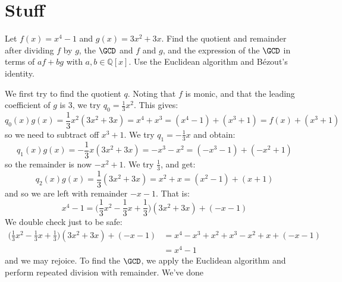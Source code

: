 \section{Stuff}
    \begin{problem}
        Let $f(x)=x^{4}-1$ and $g(x)=3x^{2}+3x$. Find the quotient and
        remainder after dividing $f$ by $g$, the $\GCD$ and $f$ and $g$,
        and the expression of the $\GCD$ in terms of $af+bg$ with
        $a,b\in\mathbb{Q}[x]$. Use the Euclidean algorithm and B\'{e}zout's
        identity.
    \end{problem}
    \begin{solution}
        We first try to find the quotient $q$. Noting that $f$ is monic, and
        that the leading coefficient of $g$ is 3, we try
        $q_{0}=\frac{1}{3}x^{2}$. This gives:
        \begin{equation}
            q_{0}(x)g(x)=\frac{1}{3}x^{2}(3x^{2}+3x)
                =x^{4}+x^{3}=(x^{4}-1)+(x^{3}+1)
                =f(x)+(x^{3}+1)
        \end{equation}
        so we need to subtract off $x^{3}+1$. We try
        $q_{1}=\minus\frac{1}{3}x$ and obtain:
        \begin{equation}
            q_{1}(x)g(x)=\minus\frac{1}{3}x(3x^{2}+3x)
                =\minus{x}^{3}-x^{2}
                =(\minus{x}^{3}-1)+(\minus{x}^{2}+1)
        \end{equation}
        so the remainder is now $\minus{x}^{2}+1$. We try $\frac{1}{3}$, and
        get:
        \begin{equation}
            q_{2}(x)g(x)=\frac{1}{3}(3x^{2}+3x)
                =x^{2}+x
                =(x^{2}-1)+(x+1)
        \end{equation}
        and so we are left with remainder $\minus{x}-1$. That is:
        \begin{equation}
            x^{4}-1=\Big(\frac{1}{3}x^{2}-\frac{1}{3}x+\frac{1}{3}\Big)
                (3x^{2}+3x)+(\minus{x}-1)
        \end{equation}
        We double check just to be safe:
        \begin{align*}
            \Big(\frac{1}{3}x^{2}-\frac{1}{3}x+\frac{1}{3}\Big)(3x^{2}+3x)
                +(\minus{x}-1)
                &=x^{4}-x^{3}+x^{2}+x^{3}-x^{2}+x+(\minus{x}-1)\\
                &=x^{4}-1
        \end{align*}
        and we may rejoice. To find the $\GCD$, we apply the Euclidean
        algorithm and perform repeated division with remainder. We've done

\end{solution}
